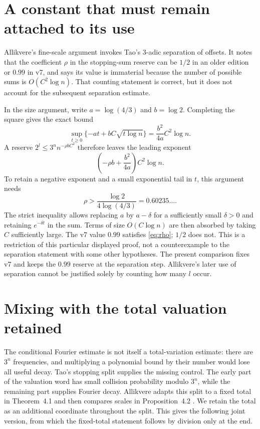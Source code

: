 \documentclass[11pt]{article}
\theoremstyle{remark}\newtheorem{remark}[proposition]{Remark}
\begin{document}
\section{A constant that must remain attached to its use}

Allikvere's fine-scale argument invokes Tao's $3$-adic separation of
offsets. It notes that the coefficient $\rho$ in the stopping-sum reserve
can be $1/2$ in an older edition or $0.99$ in v7, and says its value is
immaterial because the number of possible sums is $O(C^2\log n)$.
That counting statement is correct, but it does not account for the
subsequent separation estimate.

In the size argument, write $a=\log(4/3)$ and $b=\log2$.
Completing the square gives the exact bound
\[
 \sup_{t\geq0}\{-at+bC\sqrt{t\log n}\}
       =\frac{b^2}{4a}C^2\log n.
\]
A reserve $2^l\leq3^n n^{-\rho b C^2}$ therefore leaves the leading
exponent
\[
 \left(-\rho b+\frac{b^2}{4a}\right)C^2\log n.
\]
To retain a negative exponent and a small exponential tail in $t$, this
argument needs
\begin{equation}\label{eq:rho}
 \rho>\frac{\log2}{4\log(4/3)}=0.60235\ldots.
\end{equation}
The strict inequality allows replacing $a$ by $a-\delta$ for a sufficiently
small $\delta>0$ and retaining $e^{-\delta t}$ in the sum. Terms of size
$O(C\log n)$ are then absorbed by taking $C$ sufficiently large.
The v7 value $0.99$ satisfies \eqref{eq:rho}; $1/2$ does not.
This is a restriction of this particular displayed proof, not a
counterexample to the separation statement with some other hypotheses.
The present comparison fixes v7 and keeps the $0.99$ reserve at the
separation step. Allikvere's later use of separation cannot be justified
solely by counting how many $l$ occur.

\section{Mixing with the total valuation retained}

The conditional Fourier estimate is not itself a total-variation estimate:
there are $3^n$ frequencies, and multiplying a polynomial bound by their
number would lose all useful decay. Tao's stopping split supplies the
missing control. The early part of the valuation word has small collision
probability modulo $3^n$, while the remaining part supplies Fourier decay.
Allikvere adapts this split to a fixed total in Theorem~4.1 and then
compares scales in Proposition~4.2 \cite{Allikvere}. We retain the total as
an additional coordinate throughout the split. This gives the following
joint version, from which the fixed-total statement follows by division
only at the end.
\end{document}
